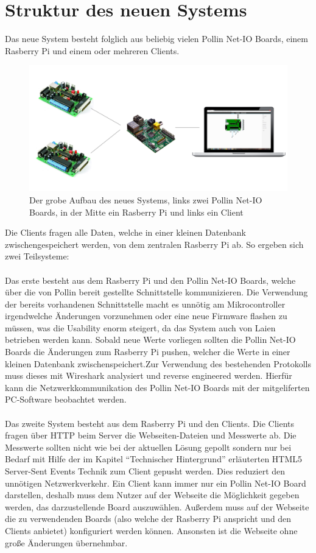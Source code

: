 \section{Struktur des neuen Systems}
Das neue System besteht folglich aus beliebig vielen Pollin Net-IO Boards, einem
Rasberry Pi und einem oder mehreren Clients. 
\begin{figure}[H]
\centering
\includegraphics[width=13cm]{content/pictures/neues_system.png}
\caption{Der grobe Aufbau des neues Systems, links zwei Pollin Net-IO Boards,
in der Mitte ein Rasberry Pi und links ein Client}
\label{struktur}
\end{figure}
Die Clients fragen alle Daten, welche in einer kleinen Datenbank
zwischengespeichert werden, von dem zentralen Rasberry Pi ab. So ergeben
sich zwei Teilsysteme: \\
\\
Das erste besteht aus dem Rasberry Pi und den Pollin Net-IO Boards,
welche über die von Pollin bereit gestellte Schnittstelle kommunizieren.
Die Verwendung der bereits vorhandenen Schnittstelle macht es unnötig am
Mikrocontroller irgendwelche Änderungen vorzunehmen oder eine neue Firmware
flashen zu müssen, was die Usability enorm steigert, da das System auch von
Laien betrieben werden kann. Sobald neue Werte vorliegen sollten die Pollin
Net-IO Boards die Änderungen zum Rasberry Pi pushen, welcher die Werte in einer
kleinen Datenbank zwischenspeichert.Zur Verwendung des bestehenden Protokolls 
muss dieses mit Wireshark analysiert und reverse engineered werden. Hierfür 
kann die Netzwerkkommunikation des Pollin Net-IO Boards mit der mitgeliferten 
PC-Software beobachtet werden.\\
\\
Das zweite System besteht aus dem Rasberry Pi und den Clients. Die Clients
fragen über HTTP beim Server die Webseiten-Dateien und Messwerte ab. Die
Messwerte sollten nicht wie bei der aktuellen Lösung gepollt sondern nur bei
Bedarf mit Hilfe der im Kapitel "`Technischer Hintergrund"' erläuterten HTML5
Server-Sent Events Technik zum Client gepusht werden. Dies reduziert den
unnötigen Netzwerkverkehr. Ein Client kann immer nur ein Pollin Net-IO Board
darstellen, deshalb muss dem Nutzer auf der Webseite die Möglichkeit gegeben
werden, das darzustellende Board auszuwählen. Außerdem muss auf der Webseite die
zu verwendenden Boards (also welche der Rasberry Pi anspricht und den Clients
anbietet) konfiguriert werden können. Ansonsten ist die Webseite ohne große
Änderungen übernehmbar.

